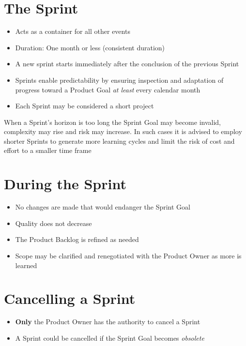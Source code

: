 \documentclass[a4paper,11pt,twocolumn]{article}
\begin{document}
\section*{The Sprint}
\begin{itemize}
	\item Acts as a container for all other events
	\item Duration: One month or less (consistent duration)
	\item A new sprint starts immediately after the conclusion of the previous Sprint
	\item Sprints enable predictability by ensuring inspection and adaptation of progress toward a Product Goal \textit{at least} every calendar month
	\item Each Sprint may be considered a short project
\end{itemize}

\begin{tcolorbox}[colback=black!8!white,colframe=gray!50!black,title=Note,sharp corners,fonttitle=\normalsize\bfseries,fontupper=\normalsize,left=0.7em,right=0.7em]
	When a Sprint's horizon is too long the Sprint Goal may become invalid, complexity may rise and risk may increase. In such cases it is advised to employ shorter Sprints to generate more learning cycles and limit the risk of cost and effort to a smaller time frame
\end{tcolorbox}

\section*{During the Sprint}
\begin{itemize}
	\item No changes are made that would endanger the Sprint Goal
	\item Quality does not decrease
	\item The Product Backlog is refined as needed
	\item Scope may be clarified and renegotiated with the Product Owner as more is learned
\end{itemize}

\section*{Cancelling a Sprint}
\begin{itemize}
	\item \textbf{Only} the Product Owner has the authority to cancel a Sprint
	\item A Sprint could be cancelled if the Sprint Goal becomes \textit{obsolete}
\end{itemize}
\end{document}
